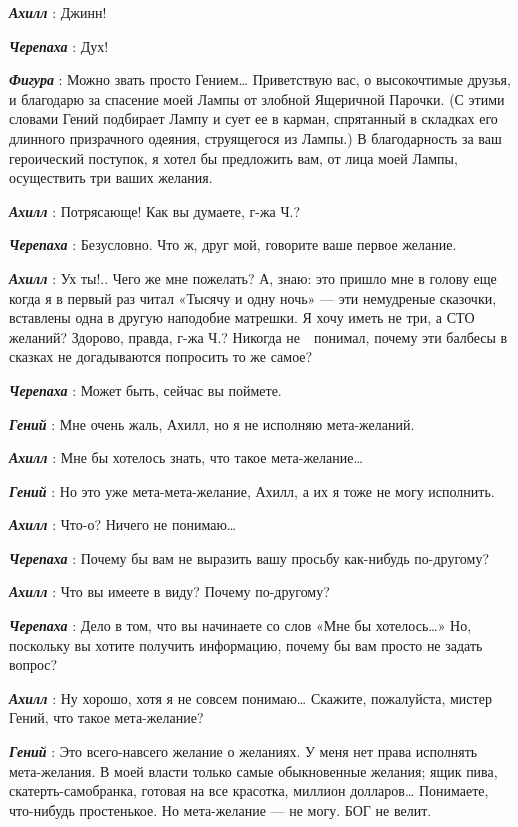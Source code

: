 \emph{\textbf{Ахилл}} : Джинн!

\emph{\textbf{Черепаха}} : Дух!

\emph{\textbf{Фигура}} : Можно звать просто Гением\ldots{} Приветствую вас, о высокочтимые друзья, и благодарю за спасение моей Лампы от злобной Ящеричной Парочки. (С этими словами Гений подбирает Лампу и сует ее в карман, спрятанный в складках его длинного призрачного одеяния, струящегося из Лампы.) В благодарность за ваш героический поступок, я хотел бы предложить вам, от лица моей Лампы, осуществить три ваших желания.

\emph{\textbf{Ахилл}} : Потрясающе! Как вы думаете, г-жа Ч.?

\emph{\textbf{Черепаха}} : Безусловно. Что ж, друг мой, говорите ваше первое желание.

\emph{\textbf{Ахилл}} : Ух ты!.. Чего же мне пожелать? А, знаю: это пришло мне в голову еще когда я в первый раз читал «Тысячу и одну ночь» --- эти немудреные сказочки, вставлены одна в другую наподобие матрешки. Я хочу иметь не три, а СТО желаний? Здорово, правда, г-жа Ч.? Никогда не~~понимал, почему эти балбесы в сказках не догадываются попросить то же самое?

\emph{\textbf{Черепаха}} : Может быть, сейчас вы поймете.

\emph{\textbf{Гений}} : Мне очень жаль, Ахилл, но я не исполняю мета-желаний.

\emph{\textbf{Ахилл}} : Мне бы хотелось знать, что такое мета-желание\ldots{}

\emph{\textbf{Гений}} : Но это уже мета-мета-желание, Ахилл, а их я тоже не могу исполнить.

\emph{\textbf{Ахилл}} : Что-о? Ничего не понимаю\ldots{}

\emph{\textbf{Черепаха}} : Почему бы вам не выразить вашу просьбу как-нибудь по-другому?

\emph{\textbf{Ахилл}} : Что вы имеете в виду? Почему по-другому?

\emph{\textbf{Черепаха}} : Дело в том, что вы начинаете со слов «Мне бы хотелось\ldots» Но, поскольку вы хотите получить информацию, почему бы вам просто не задать вопрос?

\emph{\textbf{Ахилл}} : Ну хорошо, хотя я не совсем понимаю\ldots{} Скажите, пожалуйста, мистер Гений, что такое мета-желание?

\emph{\textbf{Гений}} : Это всего-навсего желание о желаниях. У меня нет права исполнять мета-желания. В моей власти только самые обыкновенные желания; ящик пива, скатерть-самобранка, готовая на все красотка, миллион долларов\ldots{} Понимаете, что-нибудь простенькое. Но мета-желание --- не могу. БОГ не велит.

